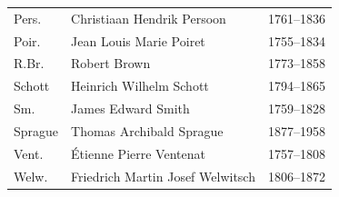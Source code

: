 \begin{longtable}{@{}p{}p{}p{}@{}}
	Pers.         & Christiaan Hendrik Persoon                 & 1761--1836 \\
	Poir.         & Jean Louis Marie Poiret                    & 1755--1834 \\
	R.Br.         & Robert Brown                               & 1773--1858 \\
	Schott        & Heinrich Wilhelm Schott                    & 1794--1865 \\
	Sm.           & James Edward Smith                         & 1759--1828 \\
	Sprague       & Thomas Archibald Sprague                   & 1877--1958 \\
	Vent.         & {\'E}tienne Pierre Ventenat                & 1757--1808 \\
	Welw.         & Friedrich Martin Josef Welwitsch           & 1806--1872 \\
\end{longtable}